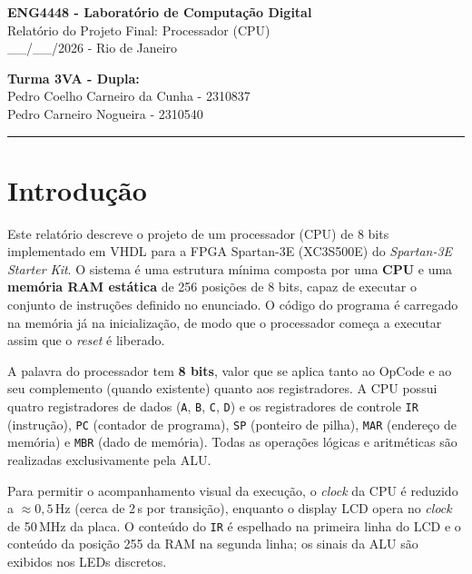 \documentclass[12pt,a4paper]{article}
\begin{document}
\begin{center}
    {\LARGE \textbf{ENG4448 - Laboratório de Computação Digital}}\\[0.3cm]
    {\Large Relatório do Projeto Final: Processador (CPU)}\\[0.2cm]
    \_\_/\_\_/2026 - Rio de Janeiro
\end{center}

\vspace{0.6cm}

\noindent \textbf{Turma 3VA - Dupla:}\\
Pedro Coelho Carneiro da Cunha - 2310837\\
Pedro Carneiro Nogueira - 2310540

\vspace{0.4cm}
\hrule
\vspace{0.6cm}

\section{Introdução}

Este relatório descreve o projeto de um processador (CPU) de 8 bits implementado em VHDL
para a FPGA Spartan-3E (XC3S500E) do \textit{Spartan-3E Starter Kit}. O sistema é uma
estrutura mínima composta por uma \textbf{CPU} e uma \textbf{memória RAM estática} de 256
posições de 8 bits, capaz de executar o conjunto de instruções definido no enunciado. O
código do programa é carregado na memória já na inicialização, de modo que o processador
começa a executar assim que o \textit{reset} é liberado.

A palavra do processador tem \textbf{8 bits}, valor que se aplica tanto ao OpCode e ao seu
complemento (quando existente) quanto aos registradores. A CPU possui quatro registradores
de dados (\texttt{A}, \texttt{B}, \texttt{C}, \texttt{D}) e os registradores de controle
\texttt{IR} (instrução), \texttt{PC} (contador de programa), \texttt{SP} (ponteiro de
pilha), \texttt{MAR} (endereço de memória) e \texttt{MBR} (dado de memória). Todas as
operações lógicas e aritméticas são realizadas exclusivamente pela ALU.

Para permitir o acompanhamento visual da execução, o \textit{clock} da CPU é reduzido a
$\approx 0{,}5$\,Hz (cerca de 2\,s por transição), enquanto o display LCD opera no
\textit{clock} de 50\,MHz da placa. O conteúdo do \texttt{IR} é espelhado na primeira linha
do LCD e o conteúdo da posição 255 da RAM na segunda linha; os sinais da ALU são exibidos
nos LEDs discretos.
\end{document}
